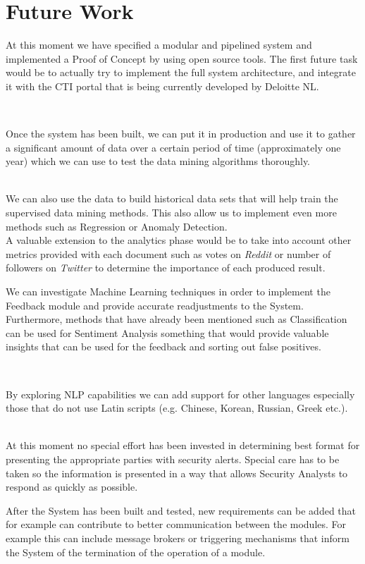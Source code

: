 \documentclass[12pt]{article}
\begin{document}
\section{Future Work} 
\parbox{\linewidth}{
At this moment we have specified a modular and pipelined system and implemented a Proof of Concept by using open source tools. The first future task would be to actually try to implement the full system architecture, and integrate it with the CTI portal that is being currently developed by Deloitte NL. }
\hfill \break\\
\parbox{\linewidth}{
Once the system has been built, we can put it in production and use it to gather a significant amount of data over a certain period of time (approximately one year) which we can use to test the data mining algorithms thoroughly. 
}
\hfill \break\\
We can also use the data to build historical data sets that will help train the supervised data mining methods. This also allow us to implement even more methods such as Regression or Anomaly Detection. 
\hfill \break\\
A valuable extension to the analytics phase would be to take into account other metrics provided with each document such as votes on \textit{Reddit} or number of followers on \textit{Twitter} to determine the importance of each produced result.
\hfill \break\\
\parbox{\linewidth}{
We can investigate Machine Learning techniques in order to implement the Feedback module and provide accurate readjustments to the System. Furthermore, methods that have already been mentioned such as Classification can be used for Sentiment Analysis something that would provide valuable insights that can be used for the feedback and sorting out false positives.
}
\hfill \break\\
\parbox{\linewidth}{
By exploring NLP capabilities we can add support for other languages especially those that do not use Latin scripts (e.g. Chinese, Korean, Russian, Greek etc.).
}
\hfill \break\\
At this moment no special effort has been invested in determining best format for presenting the appropriate parties with security alerts. Special care has to be taken so the information is presented in a way that allows Security Analysts to respond as quickly as possible. 
\hfill \break\\
\parbox{\linewidth}{
After the System has been built and tested, new requirements can be added that for example can contribute to better communication between the modules. For example this can include message brokers or triggering mechanisms that inform the System of the termination of the operation of a module.
}
\end{document}
